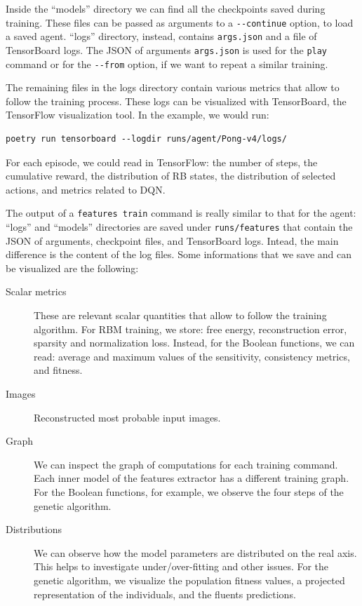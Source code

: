 Inside the ``models'' directory we can find all the checkpoints saved
during training. These files can be passed as arguments to a \verb|--continue|
option, to load a saved agent. ``logs'' directory, instead, contains
\verb|args.json| and a file of TensorBoard logs. The JSON of arguments
\verb|args.json| is used for the \texttt{play} command or for the
\verb|--from| option, if we want to repeat a similar training.

The remaining files in the logs directory contain various metrics that allow
to follow the training process. These logs can be visualized with TensorBoard,
the TensorFlow visualization tool. In the example, we would run:
\begin{verbatim}
poetry run tensorboard --logdir runs/agent/Pong-v4/logs/
\end{verbatim}
For each episode, we could read in TensorFlow: the number of steps, the
cumulative reward, the distribution of RB states, the distribution of selected
actions, and metrics related to DQN.

The output of a \texttt{features train} command is really similar to that for
the agent: ``logs'' and ``models'' directories are saved under
\verb|runs/features| that contain the JSON of arguments, checkpoint files, and
TensorBoard logs. Intead, the main difference is the content of the log files.
Some informations that we save and can be visualized are the following:
\begin{description}
	\item [Scalar metrics] These are relevant scalar quantities that allow to
		follow the training algorithm. For RBM training, we store: free energy,
		reconstruction error, sparsity and normalization loss.  Instead, for the
		Boolean functions, we can read: average and maximum values of the
		sensitivity, consistency metrics, and fitness.
	\item [Images] Reconstructed most probable input images.
	\item [Graph] We can inspect the graph of computations for each training
		command. Each inner model of the features extractor has a
		different training graph. For the Boolean functions, for example, we
		observe the four steps of the genetic algorithm.
	\item [Distributions] We can observe how the model parameters are
		distributed on the real axis. This helps to investigate under/over-fitting
		and other issues. For the genetic algorithm, we visualize the population
		fitness values, a projected representation of the individuals, and the
		fluents predictions.
\end{description}


